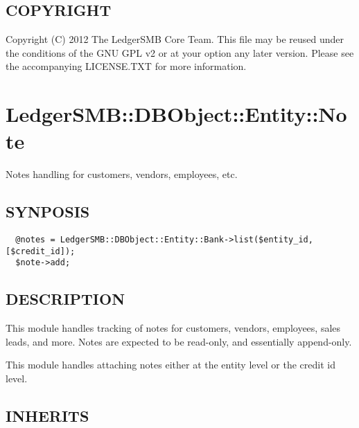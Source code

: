 \begin{description}
\begin{description}
\begin{description}
\begin{description}
\begin{description}
\begin{description}
\begin{description}
\begin{description}
\begin{description}
\end{description}
\subsection*{COPYRIGHT\label{LedgerSMB::DBObject::Entity::User_COPYRIGHT}}


Copyright (C) 2012 The LedgerSMB Core Team.  This file may be reused under the
conditions of the GNU GPL v2 or at your option any later version.  Please see
the accompanying LICENSE.TXT for more information.

\section{LedgerSMB::DBObject::Entity::Note\label{LedgerSMB::DBObject::Entity::Note}}


Notes handling for customers, vendors, 
employees, etc.

\subsection*{SYNPOSIS\label{LedgerSMB::DBObject::Entity::Note_SYNPOSIS}}
\begin{verbatim}
  @notes = LedgerSMB::DBObject::Entity::Bank->list($entity_id, [$credit_id]);
  $note->add;
\end{verbatim}
\subsection*{DESCRIPTION\label{LedgerSMB::DBObject::Entity::Note_DESCRIPTION}}


This module handles tracking of notes for customers, vendors, employees, sales
leads, and more.  Notes are expected to be read-only, and essentially
append-only.



This module handles attaching notes either at the entity level or the credit id
level.

\subsection*{INHERITS\label{LedgerSMB::DBObject::Entity::Note_INHERITS}}
\begin{description}


\end{description}
\end{description}
\end{description}
\end{description}
\end{description}
\end{description}
\end{description}
\end{description}
\end{description}
